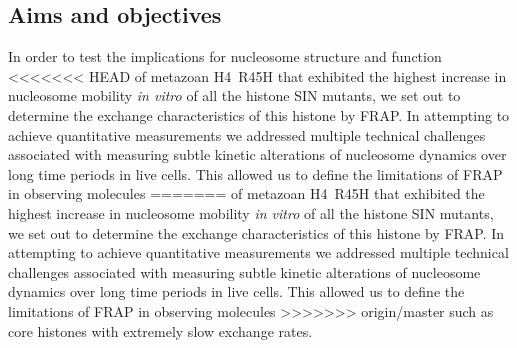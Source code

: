   \subsection{Aims and objectives}

    In order to test the implications for nucleosome structure and function
<<<<<<< HEAD
    of metazoan H4~R45H that exhibited the highest increase 
    in nucleosome mobility \textit{in vitro} of all the histone SIN mutants,
    we set out to determine the exchange characteristics of this histone by FRAP.
    In attempting to achieve quantitative measurements 
    we addressed multiple technical challenges associated with 
    measuring subtle kinetic alterations of nucleosome dynamics over long time periods in live cells. 
    This allowed us to define the limitations of FRAP in observing molecules 
=======
    of metazoan H4~R45H that exhibited the highest increase
    in nucleosome mobility \textit{in vitro} of all the histone SIN mutants,
    we set out to determine the exchange characteristics
    of this histone by FRAP.
    In attempting to achieve quantitative measurements
    we addressed multiple technical challenges associated with
    measuring subtle kinetic alterations of nucleosome dynamics
    over long time periods in live cells.
    This allowed us to define the limitations of FRAP in observing molecules
>>>>>>> origin/master
    such as core histones with extremely slow exchange rates.
